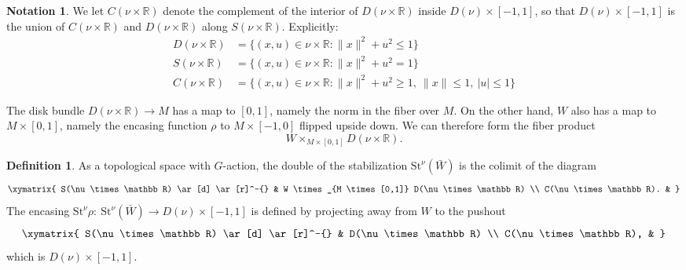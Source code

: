\documentclass[11pt]{amsart}
\theoremstyle{definition}
\newtheorem{defn}{Definition}[section]
\newtheorem{notn}{Notation}[section]
\numberwithin{equation}{section}
\numberwithin{figure}{section}
\newcommand{\R}{\mathbb R}
\newcommand{\St}{\mathrm{St}}
\begin{document}
\begin{notn}\label{complement}
	We let $C(\nu \times \R)$ denote the complement of the interior of $D(\nu\times \R)$ inside $D(\nu) \times [-1,1]$, so that $D(\nu) \times [-1,1]$ is the union of $C(\nu\times \R)$ and $D(\nu\times \R)$ along $S(\nu\times \R)$. Explicitly:
	\begin{align*}
		D(\nu \times \R) &= \{ (x,u) \in \nu \times \R : \|x\|^2 + u^2 \leq 1 \} \\
		S(\nu \times \R) &= \{ (x,u) \in \nu \times \R : \|x\|^2 + u^2 = 1 \} \\
		C(\nu \times \R) &= \{ (x,u) \in \nu \times \R : \|x\|^2 + u^2 \geq 1, \ \|x\| \leq 1, \ |u| \leq 1 \}
	\end{align*}
\end{notn}

The disk bundle $D(\nu \times \R) \to M$ has a map to $[0,1]$, namely the norm in the fiber over $M$. On the other hand, $W$ also has a map to $M\times [0,1]$, namely the encasing function $\rho$ to $M \times [-1,0]$ flipped upside down. We can therefore form the fiber product
\[ W \times_{M \times [0,1]} D(\nu \times \R). \]



\begin{defn}\label{hcob_stab}
	As a topological space with $G$-action, the double of the stabilization $\St^\nu(\bar W)$ is the colimit of the diagram
	\[ \xymatrix{
	S(\nu \times \R) \ar[d] \ar[r]^-{} & W \times_{M \times [0,1]} D(\nu \times \R) \\
	C(\nu \times \R). &
	} \]
The encasing
$ \St^\nu \rho\colon\  \St^\nu(\bar W) \to D(\nu) \times [-1,1] $
is defined by projecting away from $W$ to the pushout
\[ \xymatrix{
	S(\nu \times \R) \ar[d] \ar[r]^-{} & D(\nu \times \R) \\
	C(\nu \times \R), &
} \]
which is $D(\nu) \times [-1,1]$.
	
	
	\end{defn}
\end{document}
